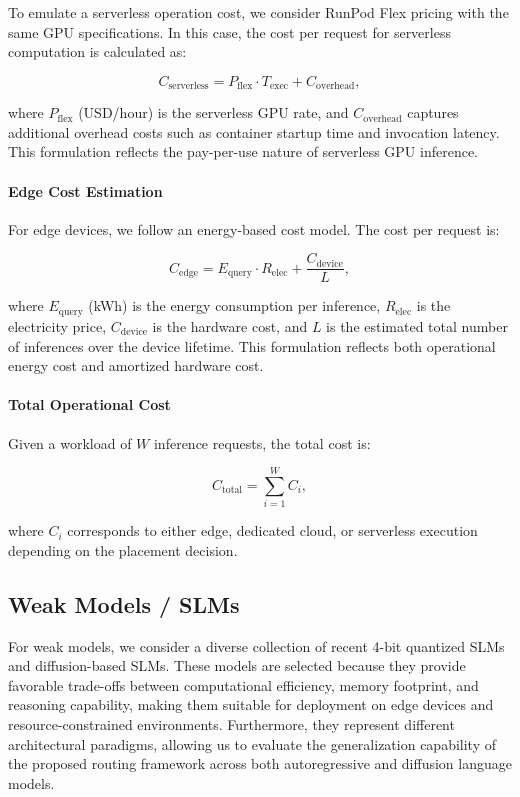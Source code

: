 \documentclass[lettersize,journal]{IEEEtran}
\begin{document}
To emulate a serverless operation cost, we consider RunPod Flex pricing with the same GPU specifications. In this case, the cost per request for serverless computation is calculated as:

\begin{equation}
    C_{\text{serverless}} = P_{\text{flex}} \cdot T_{\text{exec}} + C_{\text{overhead}},
\end{equation}

where $P_{\text{flex}}$ (USD/hour) is the serverless GPU rate, and $C_{\text{overhead}}$ captures additional overhead costs such as container startup time and invocation latency. This formulation reflects the pay-per-use nature of serverless GPU inference.

\paragraph{Edge Cost Estimation}
For edge devices, we follow an energy-based cost model. The cost per request is:

\begin{equation}
    C_{\text{edge}} = E_{\text{query}} \cdot R_{\text{elec}} + \frac{C_{\text{device}}}{L},
\end{equation}

where $E_{\text{query}}$ (kWh) is the energy consumption per inference, $R_{\text{elec}}$ is the electricity price, $C_{\text{device}}$ is the hardware cost, and $L$ is the estimated total number of inferences over the device lifetime. This formulation reflects both operational energy cost and amortized hardware cost.

\paragraph{Total Operational Cost}
Given a workload of $W$ inference requests, the total cost is:

\begin{equation}
    C_{\text{total}} = \sum_{i=1}^{W} {C_i},
\end{equation}

where $C_i$ corresponds to either edge, dedicated cloud, or serverless execution depending on the placement decision.

\subsection{Weak Models / SLMs}
For weak models, we consider a diverse collection of recent 4-bit quantized SLMs and diffusion-based SLMs. These models are selected because they provide favorable trade-offs between computational efficiency, memory footprint, and reasoning capability, making them suitable for deployment on edge devices and resource-constrained environments. Furthermore, they represent different architectural paradigms, allowing us to evaluate the generalization capability of the proposed routing framework across both autoregressive and diffusion language models.
\end{document}
